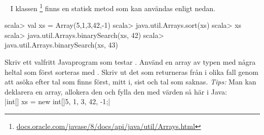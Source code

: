 \SOLUTION


\TaskSolved \what



\QUESTEND







\QUESTBEGIN

\Task  \what~ I klassen \footnote{\href{https://docs.oracle.com/javase/8/docs/api/java/util/Arrays.html}{docs.oracle.com/javase/8/docs/api/java/util/Arrays.html}} finns en statisk metod  som kan användas enligt nedan.
\begin{REPL}
scala> val xs = Array(5,1,3,42,-1)
scala> java.util.Arrays.sort(xs)
scala> xs
scala> java.util.Arrays.binarySearch(xs, 42)
scala> java.util.Arrays.binarySearch(xs, 43)
\end{REPL}
Skriv ett valfritt Javaprogram som testar . Använd en array av typen  med några heltal som först sorteras med .  Skriv ut det som returneras från    i olika fall genom att asöka efter tal som finns först, mitt i, sist och tal som saknas.
\emph{Tips:} Man kan deklarera en array, allokera den och fylla den med värden så här i Java: \\
\jcode|int[] xs = new int[]{5, 1, 3, 42, -1};|


\SOLUTION

\TaskSolved \what

\QUESTEND



%
%
%
%
%
%
%
%
%
%
%
